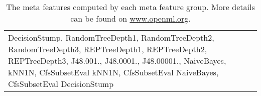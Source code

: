 \begin{table}[h]
\begin{tabularx}{\textwidth}{>{\raggedright\arraybackslash}X}
	\multicolumn{1}{>{\centering\arraybackslash}X}{Landmarkers\footnotemark{}} \\ \hline
	DecisionStump, RandomTreeDepth1, RandomTreeDepth2, RandomTreeDepth3, REPTreeDepth1, REPTreeDepth2, REPTreeDepth3, J48.001., J48.0001., J48.00001., NaiveBayes, kNN1N, CfsSubsetEval kNN1N, CfsSubsetEval NaiveBayes, CfsSubsetEval DecisionStump \\ 
	\end{tabularx}
	\caption{The meta features computed by each meta feature group. More details can be found on \href{www.openml.org}{www.openml.org}.}
	\label{tab:metaFeatureDetails}
\end{table}

